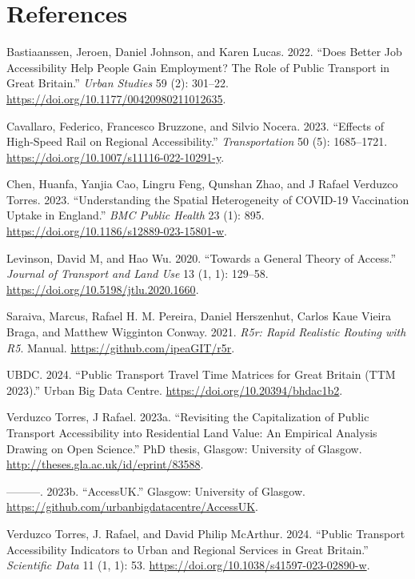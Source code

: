 \documentclass{article}
\newlength{\cslhangindent}
\newlength{\cslentryspacingunit} %
\newenvironment{CSLReferences}[2] %
 {%
  \setlength{\parindent}{0pt}
  \ifodd #1
  \let\oldpar\par
  \def\par{\hangindent=\cslhangindent\oldpar}
  \fi
  \setlength{\parskip}{#2\cslentryspacingunit}
 }%
 {}
\begin{document}
\hypertarget{references}{%
\section*{References}\label{references}}

\hypertarget{refs}{}
\begin{CSLReferences}{1}{0}
\leavevmode{}%
Bastiaanssen, Jeroen, Daniel Johnson, and Karen Lucas. 2022. {``Does
Better Job Accessibility Help People Gain Employment? {The} Role of
Public Transport in {Great Britain}.''} \emph{Urban Studies} 59 (2):
301--22. \url{https://doi.org/10.1177/00420980211012635}.

\leavevmode{}%
Cavallaro, Federico, Francesco Bruzzone, and Silvio Nocera. 2023.
{``Effects of High-Speed Rail on Regional Accessibility.''}
\emph{Transportation} 50 (5): 1685--1721.
\url{https://doi.org/10.1007/s11116-022-10291-y}.

\leavevmode{}%
Chen, Huanfa, Yanjia Cao, Lingru Feng, Qunshan Zhao, and J Rafael
Verduzco Torres. 2023. {``Understanding the Spatial Heterogeneity of
{COVID-19} Vaccination Uptake in {England}.''} \emph{BMC Public Health}
23 (1): 895. \url{https://doi.org/10.1186/s12889-023-15801-w}.

\leavevmode{}%
Levinson, David M, and Hao Wu. 2020. {``Towards a General Theory of
Access.''} \emph{Journal of Transport and Land Use} 13 (1, 1): 129--58.
\url{https://doi.org/10.5198/jtlu.2020.1660}.

\leavevmode{}%
Saraiva, Marcus, Rafael H. M. Pereira, Daniel Herszenhut, Carlos Kaue
Vieira Braga, and Matthew Wigginton Conway. 2021. \emph{R5r: {Rapid}
Realistic Routing with {R5}}. Manual.
\url{https://github.com/ipeaGIT/r5r}.

\leavevmode{}%
UBDC. 2024. {``Public Transport Travel Time Matrices for {Great Britain}
({TTM} 2023).''} Urban Big Data Centre.
\url{https://doi.org/10.20394/bhdac1b2}.

\leavevmode{}%
Verduzco Torres, J Rafael. 2023a. {``Revisiting the Capitalization of
Public Transport Accessibility into Residential Land Value: An Empirical
Analysis Drawing on {Open Science}.''} PhD thesis, Glasgow: University
of Glasgow. \url{http://theses.gla.ac.uk/id/eprint/83588}.

\leavevmode{}%
---------. 2023b. {``{AccessUK}.''} Glasgow: University of Glasgow.
\url{https://github.com/urbanbigdatacentre/AccessUK}.

\leavevmode{}%
Verduzco Torres, J. Rafael, and David Philip McArthur. 2024. {``Public
Transport Accessibility Indicators to Urban and Regional Services in
{Great Britain}.''} \emph{Scientific Data} 11 (1, 1): 53.
\url{https://doi.org/10.1038/s41597-023-02890-w}.

\end{CSLReferences}



\end{document}
